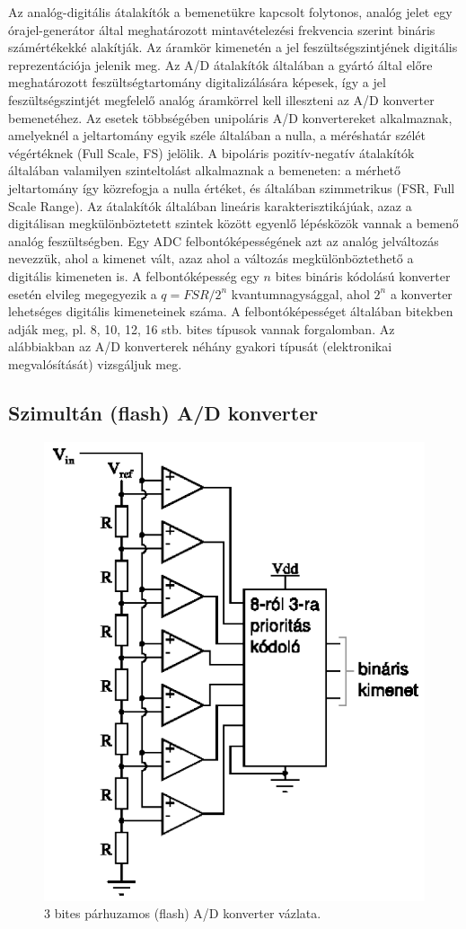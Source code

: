 \documentclass[12pt]{article}
\theoremstyle{plain}
\begin{document}
Az analóg-digitális átalakítók a bemenetükre kapcsolt folytonos, analóg jelet egy órajel-generátor által meghatározott mintavételezési frekvencia szerint bináris számértékekké alakítják. Az áramkör kimenetén a jel feszültségszintjének digitális reprezentációja jelenik meg. Az A/D átalakítók általában a gyártó által előre meghatározott feszültségtartomány digitalizálására képesek, így a jel feszültségszintjét megfelelő analóg áramkörrel kell illeszteni az A/D konverter bemenetéhez. Az esetek többségében unipoláris A/D konvertereket alkalmaznak, amelyeknél a jeltartomány egyik széle általában a nulla, a méréshatár szélét végértéknek (Full Scale, FS) jelölik. A bipoláris pozitív-negatív átalakítók általában valamilyen szinteltolást alkalmaznak a bemeneten: a mérhető jeltartomány így közrefogja a nulla értéket, és általában szimmetrikus (FSR, Full Scale Range). Az átalakítók általában lineáris karakterisztikájúak, azaz a digitálisan megkülönböztetett szintek között egyenlő lépésközök vannak a bemenő analóg feszültségben. Egy ADC felbontóképességének azt az analóg jelváltozás nevezzük, ahol a kimenet vált, azaz ahol a változás megkülönböztethető a digitális kimeneten is. A felbontóképesség egy $n$ bites bináris kódolású konverter esetén elvileg megegyezik a $q = FSR/2^n$ kvantumnagysággal, ahol $2^n$ a konverter lehetséges digitális kimeneteinek száma. A felbontóképességet általában bitekben adják meg, pl. 8, 10, 12,
16 stb. bites típusok vannak forgalomban. Az alábbiakban az A/D konverterek néhány gyakori típusát (elektronikai megvalósítását) vizsgáljuk meg.


\subsection{Szimultán (flash) A/D konverter}

\begin{figure}[]
	\centering
	\includegraphics[width=0.5\linewidth]{media/ADC_flash}
	\caption{3 bites párhuzamos (flash) A/D konverter vázlata.}
	\label{fig:adcflash}
\end{figure}
\end{document}
